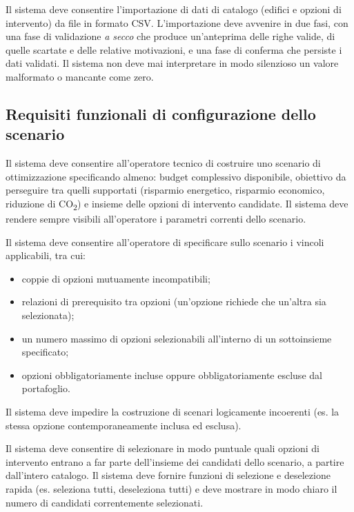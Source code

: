  \label{rf:import_csv}
Il sistema deve consentire l'importazione di dati di catalogo (edifici e opzioni di intervento) da file in formato CSV. L'importazione deve avvenire in due fasi, con una fase di validazione \emph{a secco} che produce un'anteprima delle righe valide, di quelle scartate e delle relative motivazioni, e una fase di conferma che persiste i dati validati. Il sistema non deve mai interpretare in modo silenzioso un valore malformato o mancante come zero.

\subsection{Requisiti funzionali di configurazione dello scenario}

 \label{rf:config_scenario}
Il sistema deve consentire all'operatore tecnico di costruire uno scenario di ottimizzazione specificando almeno: budget complessivo disponibile, obiettivo da perseguire tra quelli supportati (risparmio energetico, risparmio economico, riduzione di CO\textsubscript{2}) e insieme delle opzioni di intervento candidate. Il sistema deve rendere sempre visibili all'operatore i parametri correnti dello scenario.

 \label{rf:vincoli_scenario}
Il sistema deve consentire all'operatore di specificare sullo scenario i vincoli applicabili, tra cui:
\begin{itemize}
    \item coppie di opzioni mutuamente incompatibili;
    \item relazioni di prerequisito tra opzioni (un'opzione richiede che un'altra sia selezionata);
    \item un numero massimo di opzioni selezionabili all'interno di un sottoinsieme specificato;
    \item opzioni obbligatoriamente incluse oppure obbligatoriamente escluse dal portafoglio.
\end{itemize}
Il sistema deve impedire la costruzione di scenari logicamente incoerenti (es. la stessa opzione contemporaneamente inclusa ed esclusa).

 \label{rf:candidati}
Il sistema deve consentire di selezionare in modo puntuale quali opzioni di intervento entrano a far parte dell'insieme dei candidati dello scenario, a partire dall'intero catalogo. Il sistema deve fornire funzioni di selezione e deselezione rapida (es. seleziona tutti, deseleziona tutti) e deve mostrare in modo chiaro il numero di candidati correntemente selezionati.

